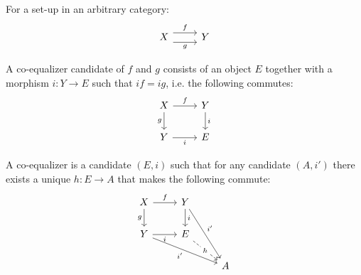 \begin{definition}
  For a set-up in an arbitrary category:
  \parencite{leinster:basic_category_theory}
  \[\begin{tikzcd}[ampersand replacement=\&]
    X \& Y
    \arrow["f", shift left=2, from=1-1, to=1-2]
    \arrow["g"', shift right=2, from=1-1, to=1-2]
  \end{tikzcd}\]

  A co-equalizer candidate of $f$ and $g$ consists of an object $E$ together
  with a morphism $i:Y\to E$ such that $if = ig$, i.e. the following commutes:
  \[\begin{tikzcd}[ampersand replacement=\&]
    X \& Y \\
    Y \& E
    \arrow["i", from=1-2, to=2-2]
    \arrow["i"', from=2-1, to=2-2]
    \arrow["g"', from=1-1, to=2-1]
    \arrow["f", from=1-1, to=1-2]
  \end{tikzcd}\]

  A co-equalizer is a candidate $(E, i)$ such that for any candidate $(A, i')$
  there exists a unique $h: E\to A$ that makes the following commute:
  \[\begin{tikzcd}[ampersand replacement=\&]
    X \& Y \\
    Y \& E \\
    \&\& A
    \arrow["i", from=1-2, to=2-2]
    \arrow["i"', from=2-1, to=2-2]
    \arrow["g"', from=1-1, to=2-1]
    \arrow["f", from=1-1, to=1-2]
    \arrow["{i'}"', from=2-1, to=3-3]
    \arrow["{i'}", from=1-2, to=3-3]
    \arrow["h"{description}, dashed, from=2-2, to=3-3]
  \end{tikzcd}\]
\end{definition}

\begin{definition}

\end{definition}